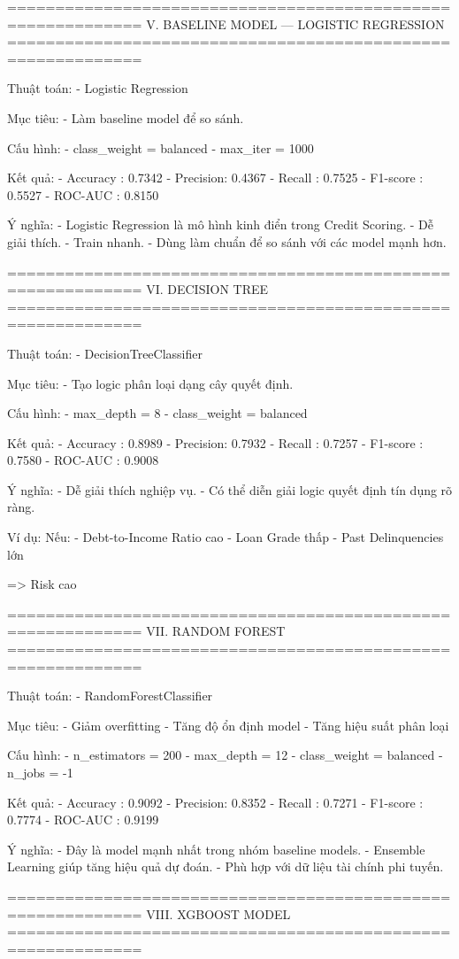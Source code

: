 ============================================================
V. BASELINE MODEL — LOGISTIC REGRESSION
============================================================

Thuật toán:
- Logistic Regression

Mục tiêu:
- Làm baseline model để so sánh.

Cấu hình:
- class_weight = balanced
- max_iter = 1000

Kết quả:
- Accuracy : 0.7342
- Precision: 0.4367
- Recall   : 0.7525
- F1-score : 0.5527
- ROC-AUC  : 0.8150

Ý nghĩa:
- Logistic Regression là mô hình kinh điển trong Credit Scoring.
- Dễ giải thích.
- Train nhanh.
- Dùng làm chuẩn để so sánh với các model mạnh hơn.

============================================================
VI. DECISION TREE
============================================================

Thuật toán:
- DecisionTreeClassifier

Mục tiêu:
- Tạo logic phân loại dạng cây quyết định.

Cấu hình:
- max_depth = 8
- class_weight = balanced

Kết quả:
- Accuracy : 0.8989
- Precision: 0.7932
- Recall   : 0.7257
- F1-score : 0.7580
- ROC-AUC  : 0.9008

Ý nghĩa:
- Dễ giải thích nghiệp vụ.
- Có thể diễn giải logic quyết định tín dụng rõ ràng.

Ví dụ:
Nếu:
- Debt-to-Income Ratio cao
- Loan Grade thấp
- Past Delinquencies lớn

=> Risk cao

============================================================
VII. RANDOM FOREST
============================================================

Thuật toán:
- RandomForestClassifier

Mục tiêu:
- Giảm overfitting
- Tăng độ ổn định model
- Tăng hiệu suất phân loại

Cấu hình:
- n_estimators = 200
- max_depth = 12
- class_weight = balanced
- n_jobs = -1

Kết quả:
- Accuracy : 0.9092
- Precision: 0.8352
- Recall   : 0.7271
- F1-score : 0.7774
- ROC-AUC  : 0.9199

Ý nghĩa:
- Đây là model mạnh nhất trong nhóm baseline models.
- Ensemble Learning giúp tăng hiệu quả dự đoán.
- Phù hợp với dữ liệu tài chính phi tuyến.

============================================================
VIII. XGBOOST MODEL
============================================================

